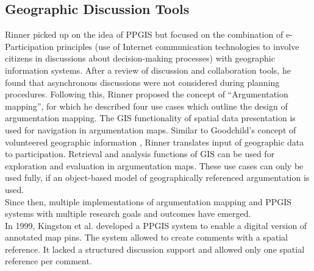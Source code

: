 \subsection{Geographic Discussion Tools}
\label{zweivier}
Rinner \cite{Rinner_ArgumentationMaps} picked up on the idea of PPGIS but focused on the combination of e-Participation principles (use of Internet communication technologies to involve citizens in discussions about decision-making processes) with geographic information systems. After a review of discussion and collaboration tools, he found that asynchronous discussions were not considered during planning procedures. Following this, Rinner proposed the concept of ``Argumentation mapping'', for which he described four use cases which outline the design of argumentation mapping. The GIS functionality of spatial data presentation is used for navigation in argumentation maps. Similar to Goodchild's concept of volunteered geographic information \cite{goodchild2007citizens}, Rinner translates input of geographic data to participation. Retrieval and analysis functions of GIS can be used for exploration and evaluation in argumentation maps. These use cases can only be used fully, if an object-based model of geographically referenced argumentation is used.\\
Since then, multiple implementations of argumentation mapping and PPGIS systems with multiple research goals and outcomes have emerged.\\
In 1999, Kingston et al. \cite{kingston1999gis} developed a PPGIS system to enable a digital version of annotated map pins. The system allowed to create comments with a spatial reference. It lacked a structured discussion support and allowed only one spatial reference per comment.\\
